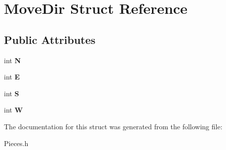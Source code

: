 \hypertarget{struct_move_dir}{\section{Move\-Dir Struct Reference}
\label{struct_move_dir}
}
\subsection*{Public Attributes}
\begin{DoxyCompactItemize}
\item 
\hypertarget{struct_move_dir_abf2617e5000f6d25e8dfe0d9cb41d5ab}{int {\bfseries N}}\label{struct_move_dir_abf2617e5000f6d25e8dfe0d9cb41d5ab}

\item 
\hypertarget{struct_move_dir_a2373da17371963eab23101b4eef0d40e}{int {\bfseries E}}\label{struct_move_dir_a2373da17371963eab23101b4eef0d40e}

\item 
\hypertarget{struct_move_dir_a02ef68f2e799daf66a82a0d9318fc2fb}{int {\bfseries S}}\label{struct_move_dir_a02ef68f2e799daf66a82a0d9318fc2fb}

\item 
\hypertarget{struct_move_dir_ae7d3fc3e4f692079d3848bff650f6edd}{int {\bfseries W}}\label{struct_move_dir_ae7d3fc3e4f692079d3848bff650f6edd}

\end{DoxyCompactItemize}


The documentation for this struct was generated from the following file\-:\begin{DoxyCompactItemize}
\item 
Pieces.\-h\end{DoxyCompactItemize}
